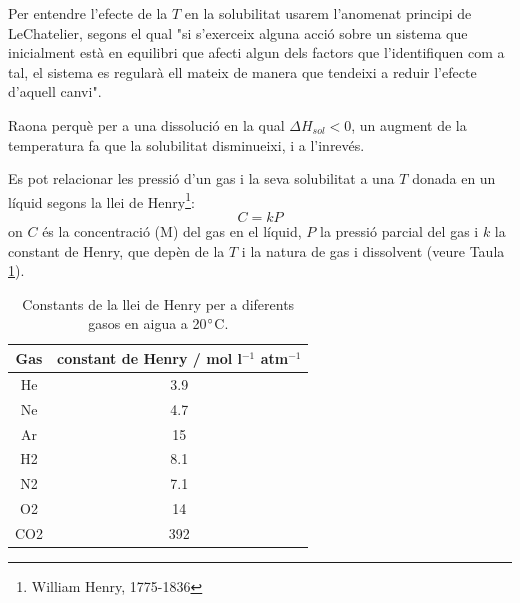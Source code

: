 Per entendre l'efecte de la $T$ en la solubilitat usarem l'anomenat principi de LeChatelier, segons el qual "si s'exerceix alguna acció sobre un sistema que inicialment està en equilibri que afecti algun dels factors que l'identifiquen com a tal, el sistema es regularà ell mateix de manera que tendeixi a reduir l'efecte d'aquell canvi".
\begin{exr}
Raona perquè per a una dissolució en la qual $\Delta H_{sol} <0$, un augment de la temperatura fa que la solubilitat disminueixi, i a l'inrevés.
\end{exr}

Es pot relacionar les pressió d'un gas i la seva solubilitat a una $T$ donada en un líquid segons la llei de Henry\footnote{William Henry, 1775-1836}:
\[
C=kP
\]
on $C$ és la concentració (M) del gas en el líquid, $P$ la pressió parcial del gas i $k$ la constant de Henry, que depèn de la $T$ i la natura de gas i dissolvent (veure Taula \ref{tab:Henry}).

\begin{table}[h!]
  \begin{center}
    \caption{Constants de la llei de Henry per a diferents gasos en aigua a 20$\degree$C.}
    \label{tab:Henry}
    \begin{tabular}{cc}
      \hline
      Gas & constant de Henry / mol l$^{-1}$ atm$^{-1}$ \\
      \hline
He &	3.9\\
Ne &	4.7\\
Ar &	15\\
H2 &	8.1\\
N2 &	7.1\\
O2 &	14\\
CO2& 	392\\      
      \hline
    \end{tabular}
  \end{center}
\end{table}